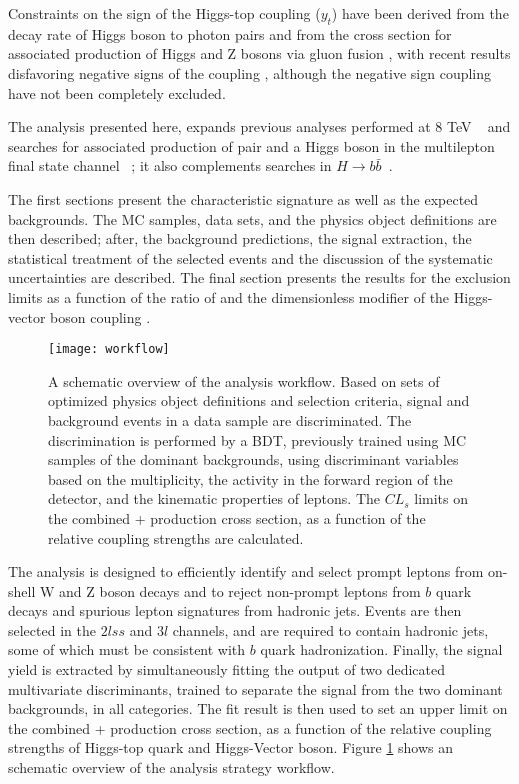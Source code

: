 Constraints on the sign of the Higgs-top coupling ($y_t$) have been derived from the decay rate of Higgs boson to photon pairs \cite{biswas} and from the cross section for associated production of Higgs and Z bosons via gluon fusion \cite{hespel}, with recent results disfavoring negative signs of the coupling \cite{cms_ht_couplings,comb_ht_couplings,diboson}, although the negative sign coupling have not been completely excluded.

The analysis presented here, expands previous analyses performed at 8 TeV ~\cite{Khachatryan_2015,CMS_AN_2014-140} and searches for associated production of \ttbar pair and a Higgs boson in the multilepton final state channel ~\cite{CMS_AN_2016-211}; it also complements searches in $H\to b\bar{b}$~\cite{CMS_PAS_HIG_16-019}.

The first sections present the characteristic \tHq signature as well as the expected backgrounds. The MC samples, data sets, and the physics object definitions are then described; after, the background predictions, the signal extraction, the statistical treatment of the selected events and the discussion of the systematic uncertainties are described. The final section presents the results for the exclusion limits as a function of the ratio of \Ct and the dimensionless modifier of the Higgs-vector boson coupling \CV.  

\begin{figure}[!h]
\begin{center}
\texttt{[image: workflow]}
\end{center}
\caption[Analysis strategy workflow]{A schematic overview of the analysis workflow. Based on sets of optimized physics object definitions and selection criteria, signal and background events in a data sample are discriminated. The discrimination is performed by a BDT, previously trained using MC samples of the dominant backgrounds, using discriminant variables based on the \bjet multiplicity, the activity in the forward region of the detector, and the kinematic properties of leptons. The $CL_s$ limits on the combined \ttH + \tH production cross section, as a function of the relative coupling strengths are calculated. }
\label{fig:workflow}
\end{figure}

The analysis is designed to efficiently identify and select prompt leptons from on-shell W and Z boson decays and to reject non-prompt leptons from $b$ quark decays and spurious lepton signatures from hadronic jets. Events are then selected in the $2lss$ and $3l$ channels, and are required to contain hadronic jets, some of which must be consistent with $b$ quark hadronization. Finally, the signal yield is extracted by simultaneously fitting the output of two dedicated multivariate discriminants, trained to separate the \tHq signal from the two dominant backgrounds, in all categories. The fit result is then used to set an upper limit on the combined \ttH + \tH production cross section, as a function of the relative coupling strengths of Higgs-top quark and Higgs-Vector boson. Figure \ref{fig:workflow} shows an schematic overview of the analysis strategy workflow. 

